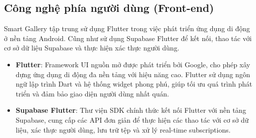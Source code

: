 \subsection{Công nghệ phía người dùng (Front-end)}

Smart Gallery tập trung sử dụng Flutter trong việc phát triển ứng dụng di động ở nền tảng Android. Cũng như sử dụng Supabase Flutter để kết nối, thao tác với cơ sở dữ liệu Supabase và thực hiện xác thực người dùng.

\begin{itemize}
    \item \textbf{Flutter}\cite{flutterdoc}: Framework UI nguồn mở được phát triển bởi Google, cho phép xây dựng ứng dụng di động đa nền tảng với hiệu năng cao. Flutter sử dụng ngôn ngữ lập trình Dart và hệ thống widget phong phú, giúp tối ưu quá trình phát triển và đảm bảo giao diện người dùng nhất quán. 
    
    \item \textbf{Supabase Flutter}\cite{supabaseflutterdoc}: Thư viện SDK chính thức kết nối Flutter với nền tảng Supabase, cung cấp các API đơn giản để thực hiện các thao tác với cơ sở dữ liệu, xác thực người dùng, lưu trữ tệp và xử lý real-time subscriptions.
\end{itemize}